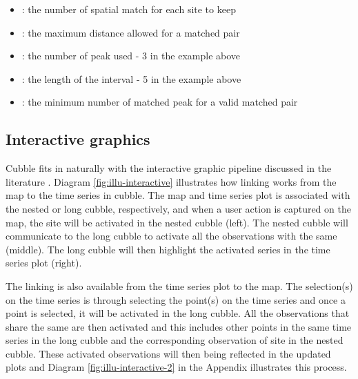\documentclass[
]{jss}
\providecommand{\tightlist}{%
  \setlength{\itemsep}{0pt}\setlength{\parskip}{0pt}}
\begin{document}
\begin{itemize}
\tightlist
\item
  : the number of spatial match for each site to keep
\item
  : the maximum distance allowed for a matched pair
\item
  : the number of peak used - 3 in the example above
\item
  : the length of the interval - 5 in the example above
\item
  : the minimum number of matched peak for a valid matched pair
\end{itemize}

\hypertarget{interactive-graphics}{%
\subsection{Interactive graphics}\label{interactive-graphics}}

Cubble fits in naturally with the interactive graphic pipeline discussed in the literature \citep{buja1988elements, buja1996interactive, sutherland2000orca, xie2014reactive, cheng2016enabling}. Diagram \ref{fig:illu-interactive} illustrates how linking works from the map to the time series in cubble. The map and time series plot is associated with the nested or long cubble, respectively, and when a user action is captured on the map, the site will be activated in the nested cubble (left). The nested cubble will communicate to the long cubble to activate all the observations with the same  (middle). The long cubble will then highlight the activated series in the time series plot (right).

The linking is also available from the time series plot to the map. The selection(s) on the time series is through selecting the point(s) on the time series and once a point is selected, it will be activated in the long cubble. All the observations that share the same  are then activated and this includes other points in the same time series in the long cubble and the corresponding observation of site in the nested cubble. These activated observations will then being reflected in the updated plots and Diagram \ref{fig:illu-interactive-2} in the Appendix illustrates this process.
\end{document}
